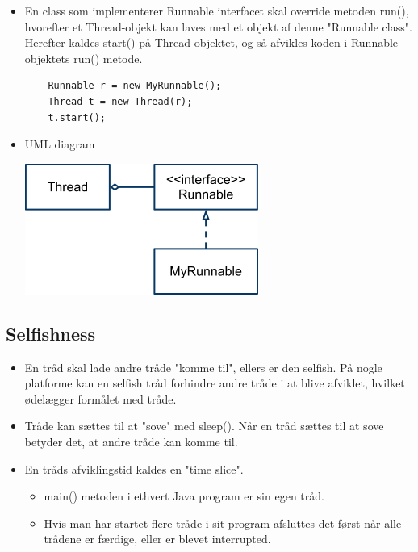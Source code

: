\begin{itemize}
  \item En class som implementerer Runnable interfacet skal override metoden run(), hvorefter et Thread-objekt kan laves med et objekt af denne "Runnable class". Herefter kaldes start() på Thread-objektet, og så afvikles koden i Runnable objektets run() metode.
  \begin{verbatim}
    Runnable r = new MyRunnable();
    Thread t = new Thread(r);
    t.start();
  \end{verbatim}
  \item UML diagram
  
  \begin{center}
    \includegraphics[scale=0.6]{images/runnable_uml.png}
  \end{center}
    
\end{itemize}

\subsection{Selfishness}

\begin{itemize}
  \item En tråd skal lade andre tråde "komme til", ellers er den selfish. På nogle platforme kan en selfish tråd forhindre andre tråde i at blive afviklet, hvilket ødelægger formålet med tråde.
  \item Tråde kan sættes til at "sove" med sleep(). Når en tråd sættes til at sove betyder det, at andre tråde kan komme til.
  \item En tråds afviklingstid kaldes en "time slice".
  \begin{itemize}
    \item main() metoden i ethvert Java program er sin egen tråd.
    \item Hvis man har startet flere tråde i sit program afsluttes det først når alle trådene er færdige, eller er blevet interrupted.
  \end{itemize}
\end{itemize}

